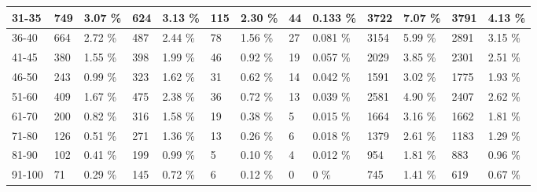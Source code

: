 \begin{table*}[]
\begin{tabular}{|l|l|l|l|l|l|l|l|l|l|l|l|l|}
        31-35   & 749                           & 3.07 \%                                & 624                              & 3.13 \%                    & 115                        & 2.30 \%                    & 44    & 0.133 \%     & 3722  & 7.07 \%  & 3791  & 4.13 \%  \\ \hline
        36-40   & 664                           & 2.72 \%                                & 487                              & 2.44 \%                    & 78                         & 1.56 \%                    & 27    & 0.081 \%     & 3154  & 5.99 \%  & 2891  & 3.15 \%  \\ \hline
        41-45   & 380                           & 1.55 \%                                & 398                              & 1.99 \%                    & 46                         & 0.92 \%                    & 19    & 0.057 \%     & 2029  & 3.85 \%  & 2301  & 2.51 \%  \\ \hline
        46-50   & 243                           & 0.99 \%                                & 323                              & 1.62 \%                    & 31                         & 0.62 \%                    & 14    & 0.042 \%     & 1591  & 3.02 \%  & 1775  & 1.93 \%  \\ \hline
        51-60   & 409                           & 1.67 \%                                & 475                              & 2.38 \%                    & 36                         & 0.72 \%                    & 13    & 0.039 \%     & 2581  & 4.90 \%  & 2407  & 2.62 \%  \\ \hline
        61-70   & 200                           & 0.82 \%                                & 316                              & 1.58 \%                    & 19                         & 0.38 \%                    & 5     & 0.015 \%     & 1664  & 3.16 \%  & 1662  & 1.81 \%  \\ \hline
        71-80   & 126                           & 0.51 \%                                & 271                              & 1.36 \%                    & 13                         & 0.26 \%                    & 6     & 0.018 \%     & 1379  & 2.61 \%  & 1183  & 1.29 \%  \\ \hline
        81-90   & 102                           & 0.41 \%                                & 199                              & 0.99 \%                    & 5                          & 0.10 \%                    & 4     & 0.012     \% & 954   & 1.81 \%  & 883   & 0.96 \%  \\ \hline
        91-100  & 71                            & 0.29 \%                                & 145                              & 0.72 \%                    & 6                          & 0.12 \%                    & 0     & 0 \%         & 745   & 1.41 \%  & 619   & 0.67 \%  \\ \hline

\end{tabular}
\end{table*}
